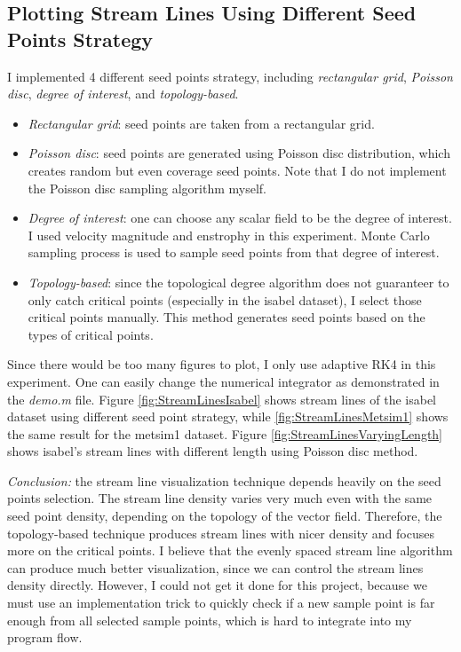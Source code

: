 \documentclass[10pt,a4paper]{article}
\begin{document}
		\subsection{Plotting Stream Lines Using Different Seed Points Strategy}
			I implemented 4 different seed points strategy, including \emph{rectangular grid}, \emph{Poisson disc}, \emph{degree of interest}, and \emph{topology-based}.
			\begin{itemize}
				\item \emph{Rectangular grid}: seed points are taken from a rectangular grid.
				\item \emph{Poisson disc}: seed points are generated using Poisson disc distribution, which creates random but even coverage seed points. Note that I do not implement the Poisson disc sampling algorithm myself.
				\item \emph{Degree of interest}: one can choose any scalar field to be the degree of interest. I used velocity magnitude and enstrophy in this experiment. Monte Carlo sampling process is used to sample seed points from that degree of interest.
				\item \emph{Topology-based}: since the topological degree algorithm does not guaranteer to only catch critical points (especially in the isabel dataset), I select those critical points manually. This method generates seed points based on the types of critical points.
			\end{itemize}
			Since there would be too many figures to plot, I only use adaptive RK4 in this experiment. One can easily change the numerical integrator as demonstrated in the \emph{demo.m} file. Figure \ref{fig:StreamLinesIsabel} shows stream lines of the isabel dataset using different seed point strategy, while \ref{fig:StreamLinesMetsim1} shows the same result for the metsim1 dataset. Figure \ref{fig:StreamLinesVaryingLength} shows isabel's stream lines with different length using Poisson disc method.
			
			\emph{Conclusion:} the stream line visualization technique depends heavily on the seed points selection. The stream line density varies very much even with the same seed point density, depending on the topology of the vector field. Therefore, the topology-based technique produces stream lines with nicer density and focuses more on the critical points. I believe that the evenly spaced stream line algorithm can produce much better visualization, since we can control the stream lines density directly. However, I could not get it done for this project, because we must use an implementation trick to quickly check if a new sample point is far enough from all selected sample points, which is hard to integrate into my program flow.
			
\end{document}
